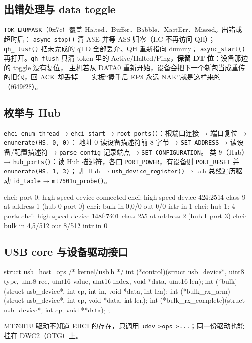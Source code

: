 \documentclass[UTF8,zihao=-4,fontset=none]{ctexart}
\newcommand{\fn}[1]{\texttt{#1}}
\begin{document}
\subsection{出错处理与 data toggle}

\fn{TOK\_ERRMASK}（0x7c）覆盖 Halted、Buffer、Babble、XactErr、Missed。出错或超时后：
\fn{async\_stop()} 清 ASE 并等 ASS 归零（HC 不再访问 QH）；\fn{qh\_flush()} 把未完成的 qTD 全部丢弃、QH 重新指向 dummy；
\fn{async\_start()} 再打开。\fn{qh\_flush} 只清 token 里的 Active/Halted/Ping，\textbf{保留 DT 位}：设备那边的 toggle 没有复位，
主机若从 DATA0 重新开始，设备会把下一个新包当成重传的旧包，回 ACK 却丢掉——实板“握手后 EP8 永远 NAK”就是这样来的（f649f28）。

\subsection{枚举与 Hub}

\fn{ehci\_enum\_thread} → \fn{ehci\_start} → \fn{root\_ports()}：根端口连接 → 端口复位 → \fn{enumerate(HS, 0, 0)}：
地址 0 读设备描述符前 8 字节 → \fn{SET\_ADDRESS} → 读设备/配置描述符 → \fn{parse\_config} 记录端点 → \fn{SET\_CONFIGURATION}。
类 9（Hub）→ \fn{hub\_ports()}：读 Hub 描述符，各口 \fn{PORT\_POWER}，有设备则 \fn{PORT\_RESET} 并 \fn{enumerate(HS, 1, 3)}；
非 Hub → \fn{usb\_device\_register()} → usb 总线遍历驱动 \fn{id\_table} → \fn{mt7601u\_probe()}。
\begin{logv}
ehci: port 0: high-speed device connected
ehci: high-speed device 424:2514 class 9 at address 1 (hub 0 port 0)
ehci:   bulk in 0,0/0 out 0/0 intr in 1
ehci: hub 1: 4 ports
ehci: high-speed device 148f:7601 class 255 at address 2 (hub 1 port 3)
ehci:   bulk in 4,5/512 out 8/512 intr in 0
\end{logv}

\subsection{USB core 与设备驱动接口}

\begin{code}
struct usb_host_ops {                       /* kernel/usb.h */
  int (*control)(struct usb_device*, uint8 type, uint8 req, uint16 value,
                 uint16 index, void *data, uint16 len);
  int (*bulk)(struct usb_device*, int ep, int in, void *data, int len);
  int (*bulk_rx_arm)(struct usb_device*, int ep, void *data, int len);
  int (*bulk_rx_complete)(struct usb_device*, int ep, void **data);
};
\end{code}
MT7601U 驱动不知道 EHCI 的存在，只调用 \fn{udev->ops->...}；同一份驱动也能挂在 DWC2（OTG）上。
\end{document}
